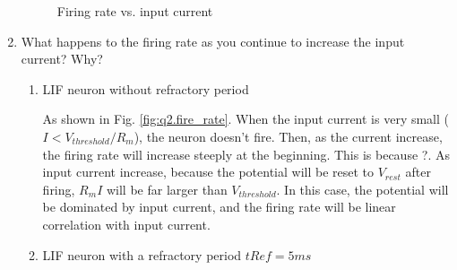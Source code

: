 \documentclass[11pt]{article}
\begin{document}
\begin{enumerate}
		\begin{figure}[htb]
			\centering
			\caption{Firing rate vs. input current}
			\label{fig:q2}
		\end{figure}
		
		\item What happens to the firing rate as you continue to increase the input current? Why?
		
		\begin{enumerate}
		    \item {LIF neuron without refractory period}
		    
		    As shown in Fig. \ref{fig:q2.fire_rate}. When the input current is very small ($I < V_{threshold}/R_m$), the neuron doesn't fire. Then, as the current increase, the firing rate will increase steeply at the beginning. This is because ?. As input current increase, because the potential will be reset to $V_{rest}$ after firing, $R_mI$ will be far larger than $V_{threshold}$. In this case, the potential will be dominated by input current, and the firing rate will be linear correlation with input current.
		    
		    \item {LIF neuron with a refractory period $tRef = 5 ms$}
		    

\end{enumerate}
\end{enumerate}
\end{document}
